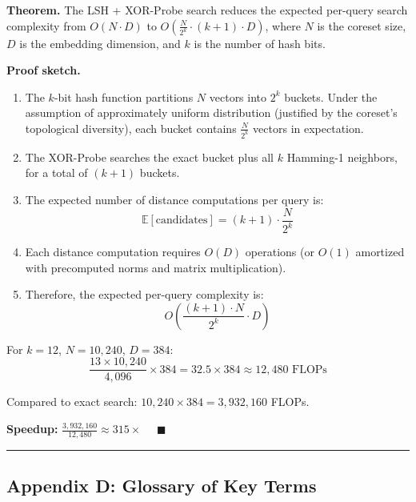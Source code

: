 \textbf{Theorem.} The LSH + XOR-Probe search reduces the expected per-query search complexity from \(O(N \cdot D)\) to \(O\left(\frac{N}{2^k} \cdot (k+1) \cdot D\right)\), where \(N\) is the coreset size, \(D\) is the embedding dimension, and \(k\) is the number of hash bits.

\textbf{Proof sketch.}

\begin{enumerate}
\def\labelenumi{\arabic{enumi}.}
\item
  The \(k\)-bit hash function partitions \(N\) vectors into \(2^k\) buckets. Under the assumption of approximately uniform distribution (justified by the coreset's topological diversity), each bucket contains \(\frac{N}{2^k}\) vectors in expectation.
\item
  The XOR-Probe searches the exact bucket plus all \(k\) Hamming-1 neighbors, for a total of \((k+1)\) buckets.
\item
  The expected number of distance computations per query is: \[\mathbb{E}[\text{candidates}] = (k+1) \cdot \frac{N}{2^k}\]
\item
  Each distance computation requires \(O(D)\) operations (or \(O(1)\) amortized with precomputed norms and matrix multiplication).
\item
  Therefore, the expected per-query complexity is: \[O\left(\frac{(k+1) \cdot N}{2^k} \cdot D\right)\]
\end{enumerate}

For \(k = 12\), \(N = 10{,}240\), \(D = 384\): \[\frac{13 \times 10{,}240}{4{,}096} \times 384 = 32.5 \times 384 \approx 12{,}480 \text{ FLOPs}\]

Compared to exact search: \(10{,}240 \times 384 = 3{,}932{,}160\) FLOPs.

\textbf{Speedup:} \(\frac{3{,}932{,}160}{12{,}480} \approx 315\times\) \(\quad \blacksquare\)

\begin{center}\rule{0.5\linewidth}{0.5pt}\end{center}

\subsection{Appendix D: Glossary of Key Terms}\label{appendix-d-glossary-of-key-terms}

